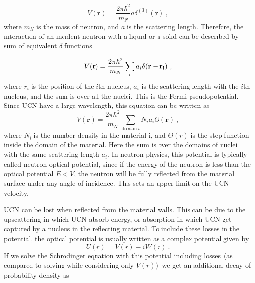 \begin{equation}
  V(\textbf{r}) = \frac{2 \pi \hbar^2}{m_N} a \delta^{(3)}(\textbf{r})~,
\end{equation}
where $m_N$ is the mass of neutron, and $a$ is the scattering
length. Therefore, the interaction of an incident neutron with a
liquid or a solid can be described by sum of equivalent $\delta$
functions

\begin{equation}
  \label{eqn:vFermi}
  V(\textbf{r}) = \frac{2\pi \hbar^2}{m_N} \sum_i a_i \delta (\bf{r} - \bf{r_i})~,
\end{equation}
where $r_i$ is the position of the $i$th nucleus, $a_i$ is the
scattering length with the $i$th nucleus, and the sum is over all the
nuclei. This is the Fermi pseudopotential. Since UCN have a large
wavelength, this equation can be written as
\begin{equation}
  \label{eqn:v}
  V(\textbf{r}) = \frac{2\pi \hbar^2}{m_N}\sum_{\mathrm{domain}~i} N_ia_i\Theta(\textbf{r})~,
\end{equation}
where $N_i$ is the number density in the material i, and $\Theta(r)$
is the step function inside the domain of the material. Here the sum
is over the domains of nuclei with the same scattering length
$a_i$. In neutron physics, this potential is typically called neutron
optical potential, since if the energy of the neutron is less than the
optical potential $E < V$, the neutron will be fully reflected from
the material surface under any angle of incidence. This sets an upper
limit on the UCN velocity.

UCN can be lost when reflected from the material walls.  This can be
due to the upscattering in which UCN absorb energy, or absorption in
which UCN get captured by a nucleus in the reflecting material. To
include these losses in the potential, the optical potential is usually
written as a complex potential given by
\begin{equation}
  \label{eqn:u}
  U(r) = V(r) - iW(r)~.  
\end{equation}
 If we solve the Schr\"{o}dinger equation with this potential
including losses~(as compared to solving while considering only
$V(r)$), we get an additional decay of probability density as

